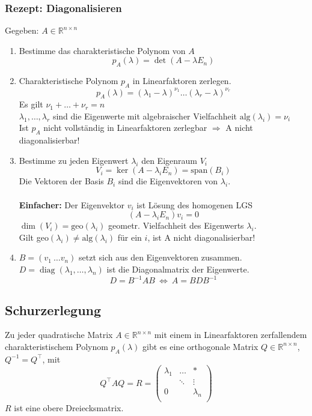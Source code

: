 \documentclass[6pt,a4paper]{scrartcl}
\DeclareMathOperator{\diag}{diag}
\begin{document}
\begin{multicols*}{4}
\subsubsection{Rezept: Diagonalisieren}
Gegeben: $A\in \mathbb{R}^{n\times n}$
\begin{enumerate}\itemsep0pt
\item Bestimme das charakteristische Polynom von $A$
\begin{equation*}
p_A(\lambda)=\det(A-\lambda E_n)
\end{equation*}
\item Charakteristische Polynom $p_A$ in Linearfaktoren zerlegen.
\begin{equation*}
p_A(\lambda)=(\lambda_1-\lambda)^{\nu_1}\dots(\lambda_r-\lambda)^{\nu_r}
\end{equation*}
Es gilt $\nu_1 + \dots + \nu_r=n$ \\
$\lambda_1,\dots, \lambda_r$ sind die Eigenwerte mit algebraischer Vielfachheit $\text{alg}(\lambda_i)=\nu_i$\\
Ist $p_A$ nicht vollständig in Linearfaktoren zerlegbar $\Rightarrow$ A nicht diagonalisierbar!
\item Bestimme zu jeden Eigenwert $\lambda_i$ den Eigenraum $V_i$
\begin{equation*}
V_i=\ker(A-\lambda_iE_n)=\text{span}(B_i)
\end{equation*}
Die Vektoren der Basis $B_i$ sind die Eigenvektoren von $\lambda_i$.\\ \\
\textbf{Einfacher:} Der Eigenvektor $v_i$ ist Lösung des homogenen LGS
\begin{equation*}
(A-\lambda_i E_n)v_i=0
\end{equation*}
$\dim(V_i)=\text{geo}(\lambda_i)$  geometr. Vielfachheit des Eigenwerts $\lambda_i$. \\
Gilt geo$(\lambda_i)\ne\text{alg}(\lambda_i)$ für ein $i$, ist A nicht diagonalisierbar!
\item $B=(v_1 \ \dots v_n)$ setzt sich aus den Eigenvektoren zusammen. \\
$D=\diag(\lambda_1,\dots,\lambda_n)$ ist die Diagonalmatrix der Eigenwerte.
\begin{equation*}
D=B^{-1}AB \ \Leftrightarrow \ A=BDB^{-1}
\end{equation*}
\end{enumerate}
\subsection{Schurzerlegung}
Zu jeder quadratische Matrix $A\in \mathbb{R}^{n\times n}$ mit einem in Linearfaktoren zerfallendem charakteristischem Polynom $p_A(\lambda)$ gibt es eine orthogonale Matrix $Q\in \mathbb{R}^{n\times n}$, $Q^{-1}=Q^\top$, mit
\begin{equation*}
Q^\top AQ=R=\begin{pmatrix}
\lambda_1 & \dots & \ast \\
 & \ddots & \vdots \\
0 &  & \lambda_n \\
\end{pmatrix}
\end{equation*}
$R$ ist eine obere Dreiecksmatrix.

\end{multicols*}
\end{document}
